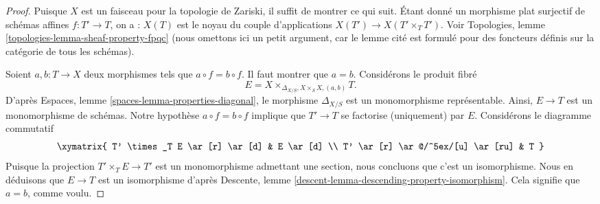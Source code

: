 \begin{proof}
Puisque $X$ est un faisceau pour la topologie de Zariski, il suffit de montrer
ce qui suit. Étant donné un morphisme plat surjectif de schémas affines
$f : T' \to T$, on a :
$X(T)$ est le noyau du couple d'applications $X(T') \to X(T' \times_T T')$.
Voir Topologies, lemme \ref{topologies-lemma-sheaf-property-fpqc}
(nous omettons ici un petit argument, car le lemme cité
est formulé pour des foncteurs définis sur la catégorie de tous les schémas).

\medskip\noindent
Soient $a, b : T \to X$ deux morphismes tels que $a \circ f = b \circ f$.
Il faut montrer que $a = b$. Considérons le produit fibré
$$
E = X \times_{\Delta_{X/S}, X \times_S X, (a, b)} T.
$$
D'après Espaces, lemme \ref{spaces-lemma-properties-diagonal},
le morphisme $\Delta_{X/S}$ est un monomorphisme représentable. Ainsi,
$E \to T$ est un monomorphisme de schémas. Notre hypothèse
$a \circ f = b \circ f$ implique que $T' \to T$ se factorise (uniquement) par $E$.
Considérons le diagramme commutatif
$$
\xymatrix{
T' \times_T E \ar[r] \ar[d] & E \ar[d] \\
T' \ar[r] \ar@/^5ex/[u] \ar[ru] & T
}
$$
Puisque la projection $T' \times_T E \to T'$ est un monomorphisme
admettant une section, nous concluons que c'est un isomorphisme. Nous en déduisons que
$E \to T$ est un isomorphisme d'après
Descente, lemme \ref{descent-lemma-descending-property-isomorphism}.
Cela signifie que $a = b$, comme voulu.


\end{proof}

